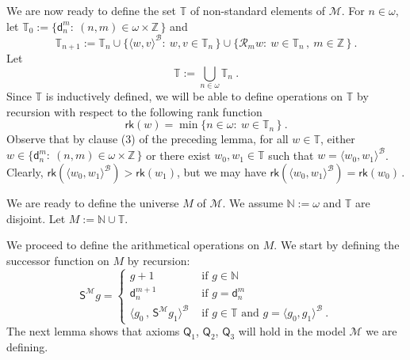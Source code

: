 \documentclass[10pt,a4paper, openany,  oldfontcommands]{memoir}
\newtheorem{open problem} [theorem] {Open Problem}
\newtheorem{open question} [theorem] {Open Question}
\renewcommand{\mathrm}{\mathsf}
\begin{document}
We are now ready to define the set  $  \mathbb{T} $ of non-standard elements of    $  \mathcal{M} $.
For $  n  \in \omega $, let  $  \mathbb{T}_0 :=   \big\{  \mathsf{d}^m_n :   \   (n,m)  \in  \omega  \times  \mathbb{Z} \,  \big\}  $
and 
\[
 \mathbb{T}_{n+1}  :=   \mathbb{T}_n  
 \cup 
  \lbrace \langle w, v  \rangle^{  \mathcal{B} }  :   \    w,  v  \in   \mathbb{T}_n  \,  \rbrace
 \cup  
\lbrace    \mathcal{R}_m w  :   \    w  \in   \mathbb{T}_n  \,   ,   \    m  \in  \mathbb{Z}  \,    \rbrace
  \      .
\]
Let  
\[
\mathbb{T} :=  \bigcup_{  n  \in  \omega  }   \mathbb{T}_n 
\      .
\]
Since   $  \mathbb{T}  $  is inductively  defined,  we will be able to define operations on   $ \mathbb{T}   $ by recursion 
with respect to the following rank function 
\[
\mathsf{rk} \left(  w  \right)  =  \min  \lbrace  n   \in  \omega   :   \    w  \in   \mathbb{T}_n    \,    \rbrace 
\    .
\]
Observe that by clause (3) of the preceding lemma,    
for all $  w  \in   \mathbb{T}  $,  either   $  w  \in  \big\{  \mathsf{d}^m_n :   \   (n,m)  \in  \omega  \times  \mathbb{Z} \,  \big\}  $  
or there exist  $  w_0,  w_1  \in  \mathbb{T}  $  such that   $  w  =  \langle  w_0,  w_1  \rangle^{  \mathcal{B}  }  $. 
Clearly,   $   \mathsf{rk} \left(   \langle  w_0 ,  w_1  \rangle^{  \mathcal{B} }  \right)  >  \mathsf{rk} \left(  w_1  \right)    $, 
but we may  have  $   \mathsf{rk} \left(   \langle  w_0 ,  w_1  \rangle^{  \mathcal{B} }  \right)  =  \mathsf{rk} \left(  w_0  \right)     \,     $.








We are ready to define the universe   $M$ of   $  \mathcal{M} $.
We assume  $  \mathbb{N} :=   \omega  $  and    $   \mathbb{T}   $  are disjoint. 
Let   $  M  :=  \mathbb{N}  \cup   \mathbb{T}  $. 







We proceed to define the arithmetical operations on  $M$. 
We start by defining  the successor function on  $M$  by recursion: 
\[
\mathrm{S}^{  \mathcal{M}  }   g   =   \begin{cases}
g +1         &   \mbox{  if  }     g    \in  \mathbb{N}
\\
\mathsf{d}^{ m+ 1}_n        &   \mbox{  if  }     g  =  \mathsf{d}^m_n 
\\
\langle  g_0  \,  ,   \,    \mathrm{S}^{  \mathcal{M}  }   g_1   \rangle^{  \mathcal{B}   }         
                              &   \mbox{  if  }   g  \in   \mathbb{T}       \mbox{  and  }     g  =  \langle  g_0,  g_1  \rangle^{  \mathcal{B}    }
\         .
\end{cases}
\]
The next lemma shows that  axioms $  \mathsf{Q}_1 $,  $  \mathsf{Q}_2 $,  $  \mathsf{Q}_3  $   will hold in the model $  \mathcal{M} $  we are defining. 
\end{document}
